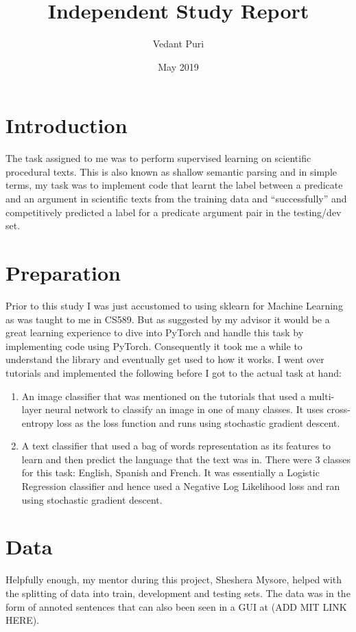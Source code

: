 \documentclass{article}
\title{Independent Study Report}
\author{Vedant Puri}
\date{May 2019}
\begin{document}
\maketitle

\section{Introduction}
The task assigned to me was to perform supervised learning on scientific procedural texts. This is also known as shallow semantic parsing and in simple terms, my task was to implement code that learnt the label between a predicate and an argument in scientific texts from the training data and ``successfully'' and competitively predicted a label for a predicate argument pair in the testing/dev set.

\section{Preparation}
Prior to this study I was just accustomed to using sklearn for Machine Learning as was taught to me in CS589. But as suggested by my advisor it would be a great learning experience to dive into PyTorch and handle this task by implementing code using PyTorch. Consequently it took me a while to understand the library and eventually get used to how it works. I went over tutorials and implemented the following before I got to the actual task at hand:

\begin{enumerate}
    \item An image classifier that was mentioned on the tutorials that used a multi-layer neural network to classify an image in one of many classes. It uses cross-entropy loss as the loss function and runs using stochastic gradient descent.
    \item A text classifier that used a bag of words representation as its features to learn and then predict the language that the text was in. There were 3 classes for this task: English, Spanish and French. It was essentially a Logistic Regression classifier and hence used a Negative Log Likelihood loss and ran using stochastic gradient descent.
\end{enumerate}


\section{Data}
Helpfully enough, my mentor during this project, Sheshera Mysore, helped with the splitting of data into train, development and testing sets. The data was in the form of annoted sentences that can also been seen in a GUI at (ADD MIT LINK HERE).
\end{document}
